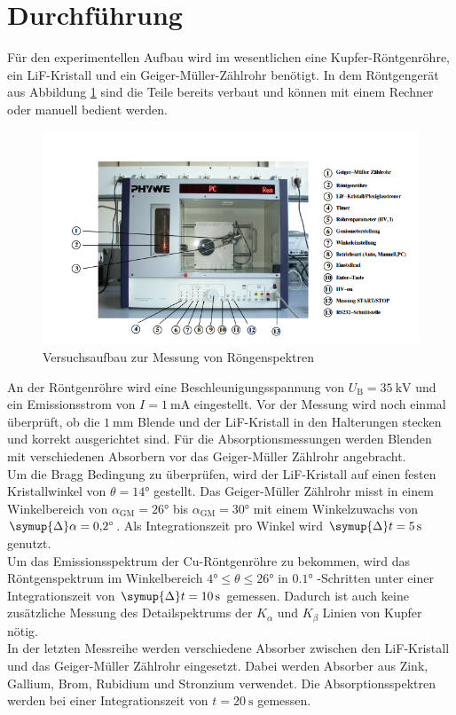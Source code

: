 \section{Durchführung}
Für den experimentellen Aufbau wird im wesentlichen eine Kupfer-Röntgenröhre, ein LiF-Kristall und ein Geiger-Müller-Zählrohr benötigt. In dem Röntgengerät aus Abbildung \ref{fig:aufbau}
sind die Teile bereits verbaut und können mit einem Rechner oder manuell bedient werden.
\begin{figure}
    \centering
    \caption{Versuchsaufbau zur Messung von Röngenspektren \cite{V602}}
    \label{fig:aufbau}
    \includegraphics[width = 0.6 \textwidth]{pics/gerät.png}
\end{figure}
An der Röntgenröhre wird eine Beschleunigungsspannung von $U_\text{B}=\SI{35}{\kilo \volt}$ und ein Emissionsstrom von $I=\SI{1}{\milli\ampere}$ eingestellt.
Vor der Messung wird noch einmal überprüft, ob die $\SI{1}{\milli\metre}$ Blende und der LiF-Kristall in den Halterungen stecken und korrekt ausgerichtet sind.
Für die Absorptionsmessungen werden Blenden mit verschiedenen Absorbern vor das Geiger-Müller Zählrohr angebracht.
\\
Um die Bragg Bedingung zu überprüfen, wird der LiF-Kristall auf einen festen Kristallwinkel von $\theta=\ang{14;;}$ gestellt. Das Geiger-Müller Zählrohr misst in einem Winkelbereich von 
$\alpha_\text{GM}=\ang{26;;} $ bis $\alpha_\text{GM}=\ang{30;;} $ mit einem Winkelzuwachs von $\symup{\Delta} \alpha =\ang{0.2;;}$. Als Integrationszeit pro Winkel wird 
$\symup{\Delta}t=\SI{5}{\second}$ genutzt.
\\
Um das Emissionsspektrum der Cu-Röntgenröhre zu bekommen, wird das Röntgenspektrum im Winkelbereich $\ang{4;;} \leq \theta \leq \ang{26;;}$ in $\ang{0.1;;}$
-Schritten unter einer Integrationszeit von $\symup{\Delta}t=\SI{10}{\second}$ gemessen. Dadurch ist auch keine zusätzliche Messung des Detailspektrums der $K_\alpha$
und $K_\beta$ Linien von Kupfer nötig.
\\
In der letzten Messreihe werden verschiedene Absorber zwischen den LiF-Kristall und das Geiger-Müller Zählrohr eingesetzt. Dabei werden Absorber aus Zink, Gallium, Brom, Rubidium und Stronzium verwendet.
Die Absorptionsspektren werden bei einer Integrationszeit von $t=\SI{20}{\second}$ gemessen.